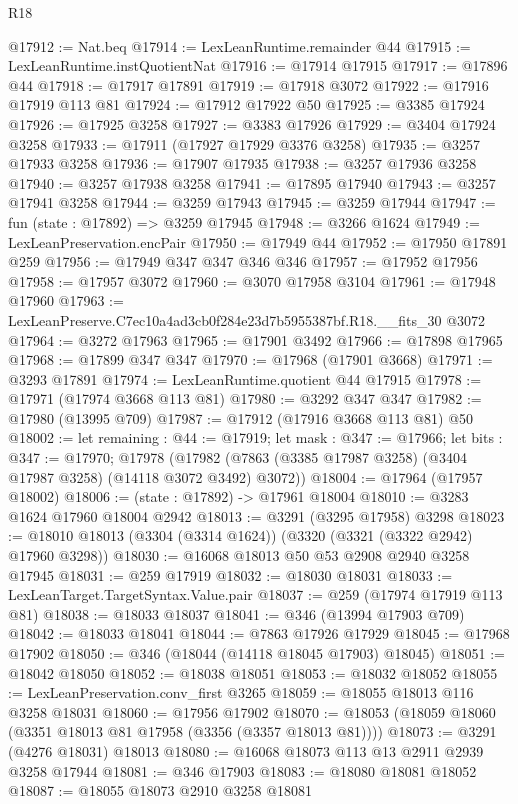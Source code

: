 \begin{lexlean}{R18}
\begin{coremodule}
@17912 := Nat.beq
@17914 := LexLeanRuntime.remainder @44
@17915 := LexLeanRuntime.instQuotientNat
@17916 := @17914 @17915
@17917 := @17896 @44
@17918 := @17917 @17891
@17919 := @17918 @3072
@17922 := @17916 @17919 @113 @81
@17924 := @17912 @17922 @50
@17925 := @3385 @17924
@17926 := @17925 @3258
@17927 := @3383 @17926
@17929 := @3404 @17924 @3258
@17933 := @17911 (@17927 @17929 @3376 @3258)
@17935 := @3257 @17933 @3258
@17936 := @17907 @17935
@17938 := @3257 @17936 @3258
@17940 := @3257 @17938 @3258
@17941 := @17895 @17940
@17943 := @3257 @17941 @3258
@17944 := @3259 @17943
@17945 := @3259 @17944
@17947 := fun (state : @17892) => @3259 @17945
@17948 := @3266 @1624
@17949 := LexLeanPreservation.encPair
@17950 := @17949 @44
@17952 := @17950 @17891 @259
@17956 := @17949 @347 @347 @346 @346
@17957 := @17952 @17956
@17958 := @17957 @3072
@17960 := @3070 @17958 @3104
@17961 := @17948 @17960
@17963 := LexLeanPreserve.C7ec10a4ad3cb0f284e23d7b5955387bf.R18.__fits_30 @3072
@17964 := @3272 @17963
@17965 := @17901 @3492
@17966 := @17898 @17965
@17968 := @17899 @347 @347
@17970 := @17968 (@17901 @3668)
@17971 := @3293 @17891
@17974 := LexLeanRuntime.quotient @44 @17915
@17978 := @17971 (@17974 @3668 @113 @81)
@17980 := @3292 @347 @347
@17982 := @17980 (@13995 @709)
@17987 := @17912 (@17916 @3668 @113 @81) @50
@18002 := let remaining : @44 := @17919;
  let mask : @347 := @17966;
  let bits : @347 := @17970;
  @17978 (@17982 (@7863 (@3385 @17987 @3258) (@3404 @17987 @3258) (@14118 @3072 @3492) @3072))
@18004 := @17964 (@17957 @18002)
@18006 := (state : @17892) -> @17961 @18004
@18010 := @3283 @1624 @17960 @18004 @2942
@18013 := @3291 (@3295 @17958) @3298
@18023 := @18010 @18013 (@3304 (@3314 @1624)) (@3320 (@3321 (@3322 @2942) @17960 @3298))
@18030 := @16068 @18013 @50 @53 @2908 @2940 @3258 @17945
@18031 := @259 @17919
@18032 := @18030 @18031
@18033 := LexLeanTarget.TargetSyntax.Value.pair
@18037 := @259 (@17974 @17919 @113 @81)
@18038 := @18033 @18037
@18041 := @346 (@13994 @17903 @709)
@18042 := @18033 @18041
@18044 := @7863 @17926 @17929
@18045 := @17968 @17902
@18050 := @346 (@18044 (@14118 @18045 @17903) @18045)
@18051 := @18042 @18050
@18052 := @18038 @18051
@18053 := @18032 @18052
@18055 := LexLeanPreservation.conv_first @3265
@18059 := @18055 @18013 @116 @3258 @18031
@18060 := @17956 @17902
@18070 := @18053 (@18059 @18060 (@3351 @18013 @81 @17958 (@3356 (@3357 @18013 @81))))
@18073 := @3291 (@4276 @18031) @18013
@18080 := @16068 @18073 @113 @13 @2911 @2939 @3258 @17944
@18081 := @346 @17903
@18083 := @18080 @18081 @18052
@18087 := @18055 @18073 @2910 @3258 @18081

\end{coremodule}
\end{lexlean}
